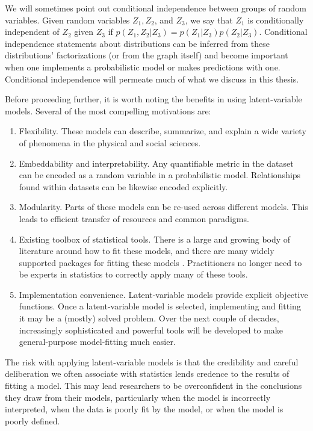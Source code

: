 We will sometimes point out conditional independence between groups of
random variables.  Given random variables $Z_1, Z_2$, and $Z_3$, we
say that $Z_1$ is conditionally independent of $Z_2$ given $Z_3$ if
$p(Z_1, Z_2 | Z_3) = p(Z_1 | Z_3) p(Z_2 | Z_3)$.  Conditional
independence statements about distributions can be inferred from these
distributions' factorizations (or from the graph itself) and become
important when one implements a probabilistic model or makes
predictions with one. Conditional independence will permeate much of
what we discuss in this thesis.

Before proceeding further, it is worth noting the benefits in using
latent-variable models.  Several of the most compelling motivations are:

\begin{enumerate}
\item Flexibility. These models can describe, summarize, and explain
  a wide variety of phenomena in the physical and social sciences.
\item Embeddability and interpretability.  Any quantifiable metric
  in the dataset can be encoded as a random variable in a
  probabilistic model.  Relationships
  found within datasets can be likewise encoded
  explicitly. \label{lvm:matching}
\item Modularity. Parts of these models can be re-used across
  different models.  This leads to efficient transfer of resources
  and common paradigms.
\item Existing toolbox of statistical tools. There is a large and
  growing body of literature around how to fit these models, and there
  are many widely supported packages for fitting these models
  \cite{bishop:2006}.  Practitioners no longer need to be experts in
  statistics to correctly apply many of these tools.
\item Implementation convenience.  Latent-variable models provide
  explicit objective functions.  Once a latent-variable model is
  selected, implementing and fitting it may be a (mostly) solved
  problem.  Over the next couple of decades, increasingly
  sophisticated and powerful tools will be developed to make
  general-purpose model-fitting much easier.
\end{enumerate}

  The risk with applying latent-variable models is that the
  credibility and careful deliberation we often associate with
  statistics lends credence to the results of fitting a model.  This may
  lead researchers to be overconfident in the conclusions they draw
  from their models, particularly when the model is incorrectly
  interpreted, when the data is poorly fit by the model, or when the
  model is poorly defined.


